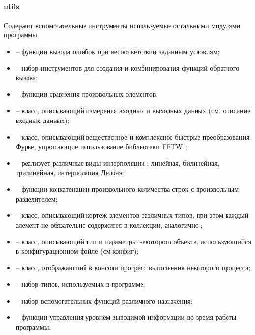 \documentclass[../document.tex]{subfiles}
\begin{document}
                \paragraph{utils}
                    \par Содержит вспомогательные инструменты используемые остальными модулями программы.
                    \begin{itemize}
                        \item{} -- функции вывода ошибок при несоответствии заданным условиям;
                        \item{} -- набор инструментов для создания и комбинирования функций обратного вызова;
                        \item{} -- функции сравнения произвольных элементов;
                        \item{} -- класс, описывающий измерения входных и выходных данных (см. описание входных данных);
                        \item{} -- класс, описывающий вещественное и комплексное быстрые преобразования Фурье, упрощающие использование библиотеки FFTW \cite{fftw3,fftw05};
                        \item{} -- реализует различные виды интерполяции \cite{interpolation,delaunay_interpolation}: линейная, билинейная, трилинейная, интерполяция Делонэ;
                        \item{} -- функции конкатенации произвольного количества строк с произвольным разделителем;
                        \item{} -- класс, описывающий кортеж элементов различных типов, при этом каждый элемент не обязательно содержится в коллекции, аналогично  \cite{optional};
                        \item{} -- класс, описывающий тип и параметры некоторого объекта, использующийся в конфигурационном файле (см конфиг);
                        \item{} -- класс, отображающий в консоли прогресс выполнения некоторого процесса;
                        \item{} -- набор типов, используемых в программе;
                        \item{} -- набор вспомогательных функций различного назначения;
                        \item{} -- функции управления уровнем выводимой информации во время работы программы.
                    \end{itemize}
\end{document}
